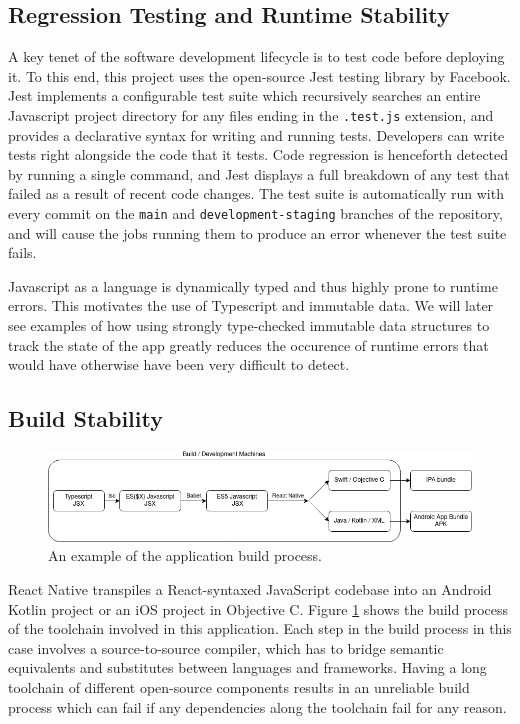 \subsection{Regression Testing and Runtime Stability}
A key tenet of the software development lifecycle is to test code before deploying it. To this end, this project uses the open-source Jest testing library by Facebook. Jest implements a configurable test suite which recursively searches an entire Javascript project directory for any files ending in the \texttt{.test.js} extension, and provides a declarative syntax for writing and running tests. Developers can write tests right alongside the code that it tests. Code regression is henceforth detected by running a single command, and Jest displays a full breakdown of any test that failed as a result of recent code changes. The test suite is automatically run with every commit on the \texttt{main} and \texttt{development-staging} branches of the repository, and will cause the jobs running them to produce an error whenever the test suite fails.

Javascript as a language is dynamically typed and thus highly prone to runtime errors. This motivates the use of Typescript and immutable data. We will later see examples of how using strongly type-checked immutable data structures to track the state of the app greatly reduces the occurence of runtime errors that would have otherwise have been very difficult to detect.


\subsection{Build Stability}
\begin{figure}[h]
    \begin{center}
        \includegraphics[scale=0.55]{images/app_build_path.png}
    \end{center}
    \caption{An example of the application build process.}
    \label{fig:app_build_process}
\end{figure}

React Native transpiles a React-syntaxed JavaScript codebase into an Android Kotlin project or an iOS project in Objective C. Figure \ref{fig:app_build_process} shows the build process of the toolchain involved in this application. Each step in the build process in this case involves a source-to-source compiler, which has to bridge semantic equivalents and substitutes between languages and frameworks. Having a long toolchain of different open-source components results in an unreliable build process which can fail if any dependencies along the toolchain fail for any reason.


